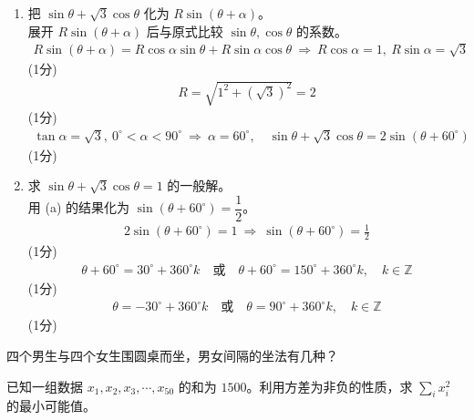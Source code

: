 \begin{solution}
    \begin{enumerate}[label=(\alph*)]
        \item 把 $\sin\theta+\sqrt3\cos\theta$ 化为 $R\sin(\theta+\alpha)$。\\
        展开 $R\sin(\theta+\alpha)$ 后与原式比较 $\sin\theta,\cos\theta$ 的系数。\\
        \begin{align*}
            R\sin(\theta+\alpha)=R\cos\alpha\sin\theta+R\sin\alpha\cos\theta
            \ \Rightarrow\ R\cos\alpha=1,\ R\sin\alpha=\sqrt3
        \end{align*}
        \hfill (1分) \\
        \begin{align*}
            R=\sqrt{1^2+(\sqrt3)^2}=2
        \end{align*}
        \hfill (1分) \\
        \begin{align*}
            \tan\alpha=\sqrt3,\ 0^\circ<\alpha<90^\circ\ \Rightarrow\ \alpha=60^\circ,\quad
            \sin\theta+\sqrt3\cos\theta=2\sin(\theta+60^\circ)
        \end{align*}
        \hfill (1分)

        \item 求 $\sin\theta+\sqrt3\cos\theta=1$ 的一般解。\\
        用 (a) 的结果化为 $\sin(\theta+60^\circ)=\dfrac12$。\\
        \begin{align*}
            2\sin(\theta+60^\circ)=1\ \Rightarrow\ \sin(\theta+60^\circ)=\frac12
        \end{align*}
        \hfill (1分) \\
        \begin{align*}
            \theta+60^\circ=30^\circ+360^\circ k\quad\text{或}\quad\theta+60^\circ=150^\circ+360^\circ k,\quad k\in\mathbb{Z}
        \end{align*}
        \hfill (1分) \\
        \begin{align*}
            \theta=-30^\circ+360^\circ k\quad\text{或}\quad\theta=90^\circ+360^\circ k,\quad k\in\mathbb{Z}
        \end{align*}
        \hfill (1分)
    \end{enumerate}
\end{solution}

\begin{question}[points = 6]
    \begin{questionparts}
        \item 四个男生与四个女生围圆桌而坐，男女间隔的坐法有几种？ 

        \item 已知一组数据 $x_1,x_2,x_3,\cdots,x_{50}$ 的和为 $1500$。利用方差为非负的性质，求 $\displaystyle\sum_i x_i^2$ 的最小可能值。 
    \end{questionparts}
\end{question}

